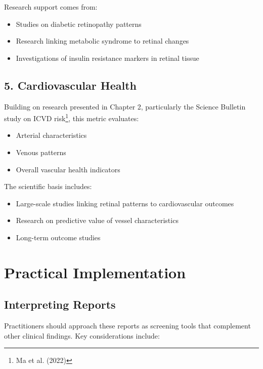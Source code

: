 \documentclass[
  Letterpaper,
]{scrbook}
\providecommand{\tightlist}{%
  \setlength{\itemsep}{0pt}\setlength{\parskip}{0pt}}\usepackage{longtable,booktabs,array}
\begin{document}
Research support comes from:

\begin{itemize}
\tightlist
\item
  Studies on diabetic retinopathy patterns
\item
  Research linking metabolic syndrome to retinal changes
\item
  Investigations of insulin resistance markers in retinal tissue
\end{itemize}

\subsection{5. Cardiovascular Health}\label{cardiovascular-health}

Building on research presented in Chapter 2, particularly the Science
Bulletin study on ICVD risk\footnote{Ma et al. (2022)}, this metric
evaluates:

\begin{itemize}
\tightlist
\item
  Arterial characteristics
\item
  Venous patterns
\item
  Overall vascular health indicators
\end{itemize}

The scientific basis includes:

\begin{itemize}
\tightlist
\item
  Large-scale studies linking retinal patterns to cardiovascular
  outcomes
\item
  Research on predictive value of vessel characteristics
\item
  Long-term outcome studies
\end{itemize}

\section{Practical Implementation}\label{practical-implementation}

\subsection{Interpreting Reports}\label{interpreting-reports}

Practitioners should approach these reports as screening tools that
complement other clinical findings. Key considerations include:
\end{document}
